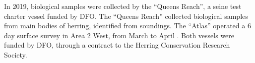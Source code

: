 In 2019, biological samples were collected by the ``Queens Reach'', a seine test charter vessel funded by DFO.
The ``Queens Reach'' collected biological samples from main bodies of herring, identified from soundings.
The ``Atlas'' operated a 6 day surface survey in Area 2 West, from March  to April .
Both vessels were funded by DFO, through a contract to the Herring Conservation Research Society.